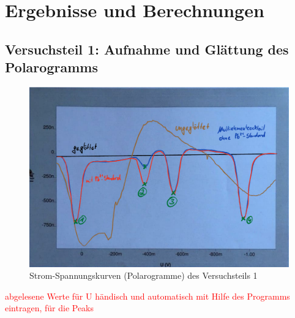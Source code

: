 \section{Ergebnisse und Berechnungen}
\label{sec:ergebnisse}
\subsection{Versuchsteil 1: Aufnahme und Glättung des Polarogramms}
 
 \begin{figure}[h!]
 	\centering
 	\includegraphics[width=1.0\textwidth]{img/Daten_farbig2}
 	\caption{Strom-Spannungskurven (Polarogramme) des Versuchsteils 1}
 	\label{fig:daten_farbig}
 \end{figure}
 \FloatBarrier
   
 \textcolor{red}{abgelesene Werte für U händisch und automatisch mit Hilfe des Programms eintragen, für die Peaks}\\
 

